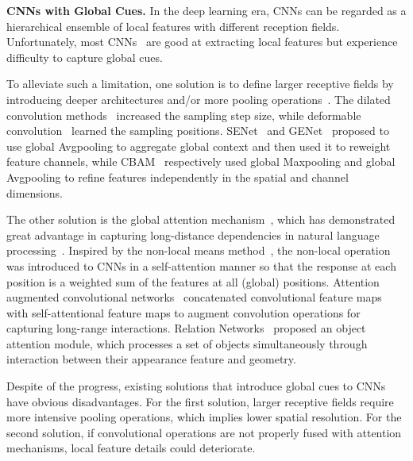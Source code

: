 \documentclass[10pt,twocolumn,letterpaper]{article}
\begin{document}
\noindent\textbf{CNNs with Global Cues.}
In the deep learning era, CNNs can be regarded as a hierarchical ensemble of local features with different reception fields. Unfortunately, most CNNs~\cite{AlexNet2012,VGG2014,ResNet2016,Inception2017,ResNeXt2017,DenseNet2017,HRNet2020} are good at extracting local features but experience difficulty to capture global cues. 

To alleviate such a limitation, one solution is to define larger receptive fields by introducing deeper architectures and/or more pooling operations~\cite{SENet2018,Gather-excite2018}. The dilated convolution methods~\cite{DilatedConv2015,Dilated2017} increased the sampling step size, while deformable convolution~\cite{DCN2017} learned the sampling positions. 
SENet~\cite{SENet2018} and GENet~\cite{Gather-excite2018} proposed to use global Avgpooling to aggregate global context and then used it to reweight feature channels, while CBAM~\cite{Cbam2018} respectively used global Maxpooling and global Avgpooling to refine features independently in the spatial and channel dimensions.


The other solution is the global attention mechanism~\cite{NonLocal2018,GCNet2019,AACN2019,RelationNet2018,BoT2021}, which has demonstrated great advantage in capturing long-distance dependencies in natural language processing~\cite{Transformer2017,Bert2018,GPT-3-2020}. Inspired by the non-local means method~\cite{NonLocal2005}, the non-local operation~\cite{NonLocal2018} was introduced to CNNs in a self-attention manner so that the response at each position is a weighted sum of the features at all (global) positions.
Attention augmented convolutional networks~\cite{AACN2019} concatenated convolutional feature maps with self-attentional feature maps to augment convolution operations for capturing long-range interactions.
Relation Networks~\cite{RelationNet2018} proposed an object attention module, which processes a set of objects simultaneously through interaction between their appearance feature and geometry.

Despite of the progress, existing solutions that introduce global cues to CNNs have obvious disadvantages. For the first solution, larger receptive fields require more intensive pooling operations, which implies lower spatial resolution. For the second solution, if convolutional operations are not properly fused with attention mechanisms, local feature details could deteriorate.
~\\
\end{document}
